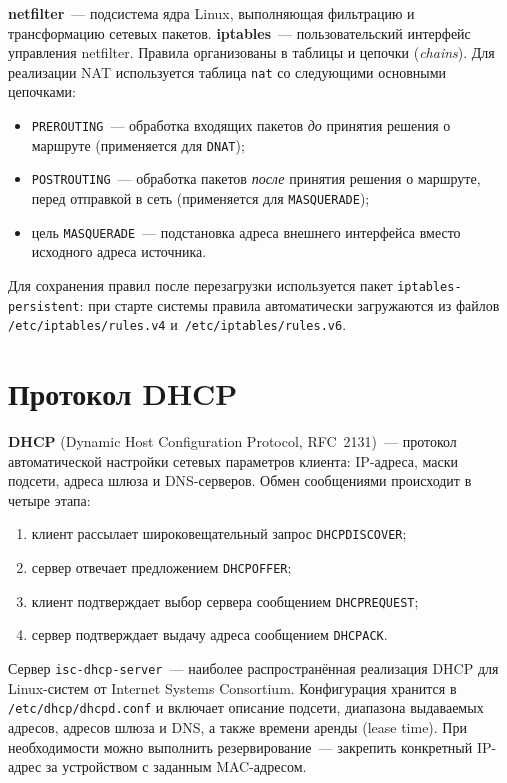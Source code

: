 \textbf{netfilter}~— подсистема ядра Linux, выполняющая фильтрацию и
трансформацию сетевых пакетов. \textbf{iptables}~— пользовательский интерфейс
управления netfilter. Правила организованы в таблицы и цепочки (\textit{chains}).
Для реализации NAT используется таблица \texttt{nat}
со следующими основными цепочками:
\begin{itemize}
  \item \texttt{PREROUTING}~— обработка входящих пакетов \textit{до} принятия
    решения о маршруте (применяется для \texttt{DNAT});
  \item \texttt{POSTROUTING}~— обработка пакетов \textit{после} принятия
    решения о маршруте, перед отправкой в сеть (применяется для \texttt{MASQUERADE});
  \item цель \texttt{MASQUERADE}~— подстановка адреса внешнего интерфейса
    вместо исходного адреса источника.
\end{itemize}

Для сохранения правил после перезагрузки используется пакет
\texttt{iptables-persistent}: при старте системы правила автоматически
загружаются из файлов \texttt{/etc/iptables/rules.v4}
и~\texttt{/etc/iptables/rules.v6}.

\section{Протокол DHCP}
\label{sec:dhcp}

\textbf{DHCP} (Dynamic Host Configuration Protocol, RFC~2131)~—
протокол автоматической настройки сетевых параметров клиента: IP-адреса, маски
подсети, адреса шлюза и DNS-серверов. Обмен сообщениями происходит в четыре
этапа:
\begin{enumerate}
  \item клиент рассылает широковещательный запрос \texttt{DHCPDISCOVER};
  \item сервер отвечает предложением \texttt{DHCPOFFER};
  \item клиент подтверждает выбор сервера сообщением \texttt{DHCPREQUEST};
  \item сервер подтверждает выдачу адреса сообщением \texttt{DHCPACK}.
\end{enumerate}

Сервер \texttt{isc-dhcp-server}~— наиболее распространённая реализация DHCP
для Linux-систем от Internet Systems Consortium. Конфигурация хранится в
\texttt{/etc/dhcp/dhcpd.conf} и включает описание подсети, диапазона
выдаваемых адресов, адресов шлюза и DNS, а также времени аренды (lease time).
При необходимости можно выполнить резервирование~— закрепить конкретный
IP-адрес за устройством с заданным MAC-адресом.

